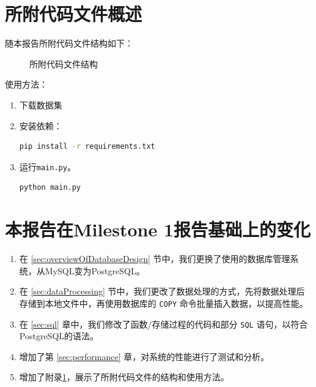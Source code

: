 \documentclass[UTF8,openany]{ctexbook}
\begin{document}
\newpage

\appendix

\chapter{所附代码文件概述}
\label{appendix:code}

随本报告所附代码文件结构如下：

\begin{figure}[H]
  \caption{所附代码文件结构}
  \label{fig:processData}
\end{figure}

使用方法：

\begin{enumerate}
  \item 下载数据集
  \item 安装依赖：
\begin{lstlisting}[language=bash]
pip install -r requirements.txt
\end{lstlisting}
  \item 运行\texttt{main.py}。
\begin{lstlisting}[language=bash]
python main.py
\end{lstlisting}
\end{enumerate}

\newpage

\chapter{本报告在Milestone 1报告基础上的变化}

\begin{enumerate}
    \item 在 \ref{sec:overviewOfDatabaseDesign} 节中，我们更换了使用的数据库管理系统，从MySQL变为PostgreSQL。
    \item 在 \ref{sec:dataProcessing} 节中，我们更改了数据处理的方式，先将数据处理后存储到本地文件中，再使用数据库的 \texttt{COPY} 命令批量插入数据，以提高性能。
    \item 在 \ref{sec:sql} 章中，我们修改了函数/存储过程的代码和部分 \texttt{SQL} 语句，以符合PostgreSQL的语法。
    \item 增加了第 \ref{sec:performance} 章，对系统的性能进行了测试和分析。
    \item 增加了附录\ref{appendix:code}，展示了所附代码文件的结构和使用方法。
\end{enumerate}
\end{document}

